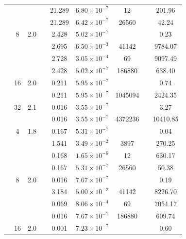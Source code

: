 \begin{table}[htbp]
\begin{tabular}{l S[table-format=3.0] S[table-format=4.1] l S[table-format=3.3] S[table-format=1.2e2] S[table-format=6.0] S[table-format=2.0] S[table-format=4.2]}
     &  &  &  & 21.289 & $6.80 \times 10^{-7}$ & 12 & {\text{---}} & 201.96 \\
     &  &  &  & 21.289 & $6.42 \times 10^{-7}$ & 26560 & {\text{---}} & 42.24 \\
     & 8 & 2.0 &  & 2.428 & $5.02 \times 10^{-7}$ & {\text{---}} & {\text{---}} & 0.23 \\
     &  &  &  & 2.695 & $6.50 \times 10^{-3}$ & 41142 & {\text{---}} & 9784.07 \\
     &  &  &  & 2.728 & $3.05 \times 10^{-4}$ & 69 & {\text{---}} & 9097.49 \\
     &  &  &  & 2.428 & $5.02 \times 10^{-7}$ & 186880 & {\text{---}} & 638.40 \\
     & 16 & 2.0 &  & 0.211 & $5.95 \times 10^{-7}$ & {\text{---}} & {\text{---}} & 0.74 \\
     &  &  &  & 0.211 & $5.95 \times 10^{-7}$ & 1045094 & {\text{---}} & 2424.35 \\
     & 32 & 2.1 &  & 0.016 & $3.55 \times 10^{-7}$ & {\text{---}} & {\text{---}} & 3.27 \\
     &  &  &  & 0.016 & $3.55 \times 10^{-7}$ & 4372236 & {\text{---}} & 10410.85 \\
    \midrule
     & 4 & 1.8 &  & 0.167 & $5.31 \times 10^{-7}$ & {\text{---}} & {\text{---}} & 0.04 \\
     &  &  &  & 1.541 & $3.49 \times 10^{-2}$ & 3897 & {\text{---}} & 270.25 \\
     &  &  &  & 0.168 & $1.65 \times 10^{-6}$ & 12 & {\text{---}} & 630.17 \\
     &  &  &  & 0.167 & $5.31 \times 10^{-7}$ & 26560 & {\text{---}} & 50.38 \\
     & 8 & 2.0 &  & 0.016 & $7.67 \times 10^{-7}$ & {\text{---}} & {\text{---}} & 0.19 \\
     &  &  &  & 3.184 & $5.00 \times 10^{-2}$ & 41142 & {\text{---}} & 8226.70 \\
     &  &  &  & 0.069 & $8.06 \times 10^{-4}$ & 69 & {\text{---}} & 7054.17 \\
     &  &  &  & 0.016 & $7.67 \times 10^{-7}$ & 186880 & {\text{---}} & 609.74 \\
     & 16 & 2.0 &  & 0.001 & $7.23 \times 10^{-7}$ & {\text{---}} & {\text{---}} & 0.60 \\

\end{tabular}
\end{table}
